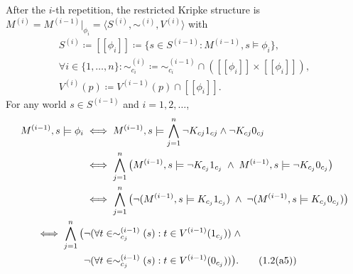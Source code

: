 After the $i$-th repetition, the restricted Kripke structure is 
$M^{(i)} = M^{(i-1)}|_{\phi_i} = \langle S^{(i)}, \sim^{(i)}, V^{(i)} \rangle$ with
\begin{gather*}
    S^{(i)} \coloneqq [\![ \phi_i ]\!] \coloneqq 
        \{ s \in S^{(i-1)} : M^{(i-1)},s \models \phi_i \}, \\
    \forall i \in \{1,\dots,n\}: 
        \sim_{c_i}^{(i)} \coloneqq 
        \sim_{c_i}^{(i-1)} \cap ([\![ \phi_i ]\!] \times [\![ \phi_i ]\!]), \\
    V^{(i)}(p) \coloneqq V^{(i-1)}(p) \cap [\![ \phi_i ]\!].
    \tag{1.2(a4)}\label{eq:1.2(a4)}
\end{gather*}
For any world $s \in S^{(i-1)}$ and $i = 1,2,\dots$,
\begin{align*}
    M^{(i-1)},s \models \phi_i 
        &\iff M^{(i-1)},s \models \bigwedge\limits_{j=1}^{n} \neg K_{cj}1_{cj} \land \neg K_{cj}0_{cj} \\
        &\iff \bigwedge_{j=1}^{n} \big( 
            M^{(i-1)},s \models \neg K_{c_j}1_{c_j} 
            \;\land\; M^{(i-1)},s \models \neg K_{c_j}0_{c_j} \big) \\
        &\iff \bigwedge_{j=1}^{n} \big( 
            \neg (M^{(i-1)},s \models K_{c_j}1_{c_j}) 
            \;\land\; \neg (M^{(i-1)},s \models K_{c_j}0_{c_j}) \big) \\
        \iff \bigwedge_{j=1}^{n} \big( 
            &\neg(\forall t \in \sim_{c_j}^{(i-1)}(s): t \in V^{(i-1)}(1_{c_j}))
            \;\land\; \\
            &\neg(\forall t \in \sim_{c_j}^{(i-1)}(s): 
                t \in V^{(i-1)}(0_{c_j})) \big). \tag{1.2(a5)}\label{eq:1.2(a5)}
\end{align*}

